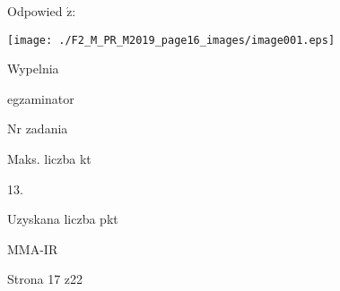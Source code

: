 \documentclass[a4paper,12pt]{article}
\begin{document}
Odpowied $\acute{\mathrm{z}}$:
\begin{center}
\texttt{[image: ./F2\_M\_PR\_M2019\_page16\_images/image001.eps]}
\end{center}
Wypelnia

egzaminator

Nr zadania

Maks. liczba kt

13.

Uzyskana liczba pkt

MMA-IR

Strona 17 z22
\end{document}
